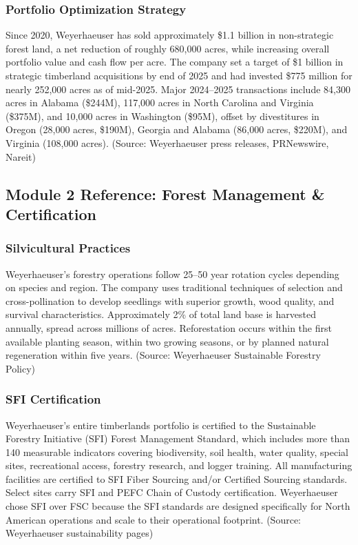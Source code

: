 \documentclass[11pt,letterpaper]{article}
\begin{document}
\subsubsection{Portfolio Optimization Strategy}

Since 2020, Weyerhaeuser has sold approximately \$1.1 billion in non-strategic forest land, a net reduction of roughly 680,000 acres, while increasing overall portfolio value and cash flow per acre. The company set a target of \$1 billion in strategic timberland acquisitions by end of 2025 and had invested \$775 million for nearly 252,000 acres as of mid-2025. Major 2024--2025 transactions include 84,300 acres in Alabama (\$244M), 117,000 acres in North Carolina and Virginia (\$375M), and 10,000 acres in Washington (\$95M), offset by divestitures in Oregon (28,000 acres, \$190M), Georgia and Alabama (86,000 acres, \$220M), and Virginia (108,000 acres). (Source: Weyerhaeuser press releases, PRNewswire, Nareit)

\subsection{Module 2 Reference: Forest Management \& Certification}

\subsubsection{Silvicultural Practices}

Weyerhaeuser's forestry operations follow 25--50 year rotation cycles depending on species and region. The company uses traditional techniques of selection and cross-pollination to develop seedlings with superior growth, wood quality, and survival characteristics. Approximately 2\% of total land base is harvested annually, spread across millions of acres. Reforestation occurs within the first available planting season, within two growing seasons, or by planned natural regeneration within five years. (Source: Weyerhaeuser Sustainable Forestry Policy)

\subsubsection{SFI Certification}

Weyerhaeuser's entire timberlands portfolio is certified to the Sustainable Forestry Initiative (SFI) Forest Management Standard, which includes more than 140 measurable indicators covering biodiversity, soil health, water quality, special sites, recreational access, forestry research, and logger training. All manufacturing facilities are certified to SFI Fiber Sourcing and/or Certified Sourcing standards. Select sites carry SFI and PEFC Chain of Custody certification. Weyerhaeuser chose SFI over FSC because the SFI standards are designed specifically for North American operations and scale to their operational footprint. (Source: Weyerhaeuser sustainability pages)
\end{document}
